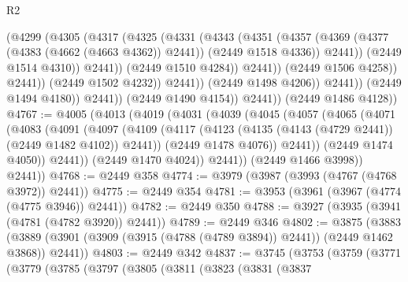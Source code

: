 \begin{lexlean}{R2}
\begin{coremodule}
                                    (@4299
                                      (@4305
                                        (@4317
                                          (@4325
                                            (@4331
                                              (@4343
                                                (@4351
                                                  (@4357
                                                    (@4369
                                                      (@4377 (@4383 (@4662 (@4663 @4362)) @2441))
                                                      (@2449 @1518 @4336))
                                                    @2441))
                                                (@2449 @1514 @4310))
                                              @2441))
                                          (@2449 @1510 @4284))
                                        @2441))
                                    (@2449 @1506 @4258))
                                  @2441))
                              (@2449 @1502 @4232))
                            @2441))
                        (@2449 @1498 @4206))
                      @2441))
                  (@2449 @1494 @4180))
                @2441))
            (@2449 @1490 @4154))
          @2441))
      (@2449 @1486 @4128))
@4767 := @4005
    (@4013
      (@4019
        (@4031
          (@4039
            (@4045
              (@4057
                (@4065
                  (@4071
                    (@4083
                      (@4091
                        (@4097
                          (@4109
                            (@4117 (@4123 (@4135 (@4143 (@4729 @2441)) (@2449 @1482 @4102)) @2441))
                            (@2449 @1478 @4076))
                          @2441))
                      (@2449 @1474 @4050))
                    @2441))
                (@2449 @1470 @4024))
              @2441))
          (@2449 @1466 @3998))
        @2441))
@4768 := @2449 @358
@4774 := @3979 (@3987 (@3993 (@4767 (@4768 @3972)) @2441))
@4775 := @2449 @354
@4781 := @3953 (@3961 (@3967 (@4774 (@4775 @3946)) @2441))
@4782 := @2449 @350
@4788 := @3927 (@3935 (@3941 (@4781 (@4782 @3920)) @2441))
@4789 := @2449 @346
@4802 := @3875
    (@3883 (@3889 (@3901 (@3909 (@3915 (@4788 (@4789 @3894)) @2441)) (@2449 @1462 @3868)) @2441))
@4803 := @2449 @342
@4837 := @3745
    (@3753
      (@3759
        (@3771
          (@3779
            (@3785
              (@3797
                (@3805
                  (@3811
                    (@3823
                      (@3831
                        (@3837

\end{coremodule}
\end{lexlean}
